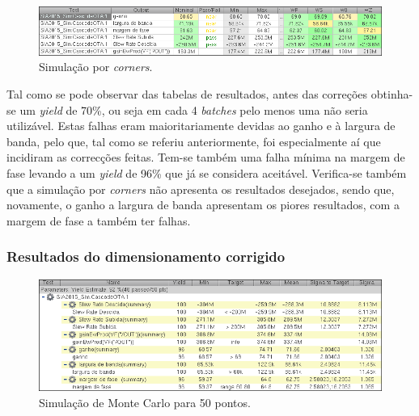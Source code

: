 \documentclass[11pt]{article}
\numberwithin{equation}{section}
\begin{document}
\begin{figure}[H]
	\centering
	\includegraphics[keepaspectratio=true, scale=0.65]{exps/Corners_Antigo}
	\vspace{-0.5em}
	\caption{Simulação por \textit{corners}.}
	\vspace{-0.8em}
\end{figure} 

Tal como se pode observar das tabelas de resultados, antes das correções obtinha-se um \textit{yield} de 70\%, ou seja em cada 4 \textit{batches} pelo menos uma não seria utilizável. Estas falhas eram maioritariamente devidas ao ganho e à largura de banda, pelo que, tal como se referiu anteriormente, foi especialmente aí que incidiram as correcções feitas. Tem-se também uma falha mínima na margem de fase levando a um \textit{yield} de 96\% que já se considera aceitável. Verifica-se também que a simulação por \textit{corners} não apresenta os resultados desejados, sendo que, novamente, o ganho a largura de banda apresentam os piores resultados, com a margem de fase a também ter falhas.

\subsubsection{Resultados do dimensionamento corrigido} 

\begin{figure}[H]
	\centering
	\includegraphics[keepaspectratio=true, scale=0.65]{exps/MonteCarlo_50pt_Novo}
	\vspace{-0.5em}
	\caption{Simulação de Monte Carlo para 50 pontos.}
	\vspace{-0.8em}
\end{figure} 
\end{document}
